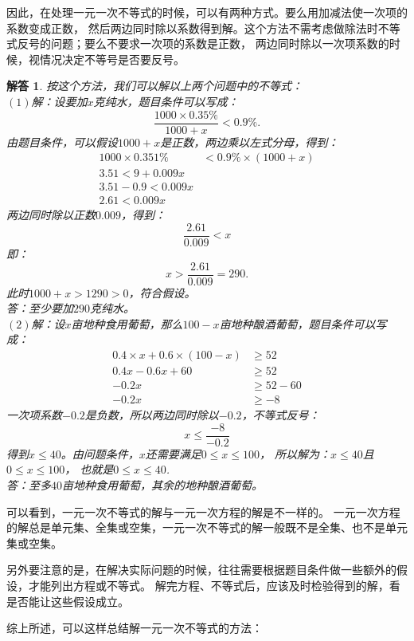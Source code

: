 \documentclass[12pt,UTF8]{ctexbook}
\newtheorem*{so}{解答}
\begin{document}
因此，在处理一元一次不等式的时候，可以有两种方式。要么用加减法使一次项的系数变成正数，
然后两边同时除以系数得到解。这个方法不需考虑做除法时不等式反号的问题；要么不要求一次项的系数是正数，
两边同时除以一次项系数的时候，视情况决定不等号是否要反号。
\begin{so}
    按这个方法，我们可以解以上两个问题中的不等式：\\
    $(1)$解：设要加$x$克纯水，题目条件可以写成：
    $$ \frac{1000 \times 0.35\%}{1000 + x} < 0.9\%.$$
    由题目条件，可以假设$1000+x$是正数，两边乘以左式分母，得到：
    \begin{align*}
        1000 \times 0.351\% &< 0.9\% \times (1000 + x)  \\
        3.51 < 9 + 0.009x  \\
        3.51 - 0.9 < 0.009x  \\
        2.61 < 0.009x 
    \end{align*}
    两边同时除以正数$0.009$，得到：
    $$ \frac{2.61}{0.009} < x$$
    即：
    $$ x > \frac{2.61}{0.009} = 290.$$
    此时$1000+x > 1290 > 0$，符合假设。\\
    答：至少要加$290$克纯水。\\
    $(2)$解：设$x$亩地种食用葡萄，那么$100 - x$亩地种酿酒葡萄，题目条件可以写成：
    \begin{align*}
        0.4 \times x + 0.6 \times (100 - x) &\geqslant 52  \\
        0.4x - 0.6x + 60 &\geqslant 52  \\
        -0.2x &\geqslant 52 - 60  \\
        -0.2x &\geqslant -8 
    \end{align*}
    一次项系数$-0.2$是负数，所以两边同时除以$-0.2$，不等式反号：
    $$ x \leqslant \frac{-8}{-0.2}$$
    得到$x \leqslant 40$。由问题条件，$x$还需要满足$0 \leqslant x \leqslant 100$，
    所以解为：$x \leqslant 40$且$0 \leqslant x \leqslant 100$，
    也就是$0 \leqslant x \leqslant 40$.\\
    答：至多$40$亩地种食用葡萄，其余的地种酿酒葡萄。
\end{so}
可以看到，一元一次不等式的解与一元一次方程的解是不一样的。
一元一次方程的解总是单元集、全集或空集，一元一次不等式的解一般既不是全集、也不是单元集或空集。

另外要注意的是，在解决实际问题的时候，往往需要根据题目条件做一些额外的假设，才能列出方程或不等式。
解完方程、不等式后，应该及时检验得到的解，看是否能让这些假设成立。

综上所述，可以这样总结解一元一次不等式的方法：
\end{document}
